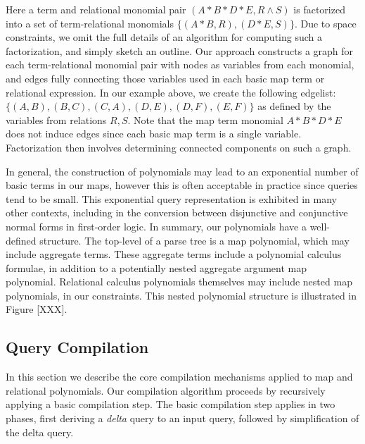Here a term and relational monomial pair $(A*B*D*E, R \wedge S)$ is factorized
into a set of term-relational monomials $\{(A*B,R), (D*E,S)\}$. Due to space
constraints, we omit the full details of an algorithm for computing such a
factorization, and simply sketch an outline. Our approach constructs a graph for
each term-relational monomial pair with nodes as variables from each monomial,
and edges fully connecting those variables used in each basic map term or
relational expression. In our example above, we create the following edgelist:
$\{(A,B), (B,C), (C,A), (D,E), (D,F), (E,F)\}$ as defined by the variables from
relations $R,S$. Note that the map term monomial $A*B*D*E$ does not induce edges
since each basic map term is a single variable. Factorization then involves
determining connected components on such a graph.

In general, the construction of polynomials may lead to an exponential number of
basic terms in our maps, however this is often acceptable in practice since
queries tend to be small. This exponential query representation is exhibited in
many other contexts, including in the conversion between disjunctive and
conjunctive normal forms in first-order logic. In summary, our polynomials have
a well-defined structure. The top-level of a parse tree is a map polynomial,
which may include aggregate terms. These aggregate terms include a polynomial
calculus formulae, in addition to a potentially nested aggregate argument map
polynomial. Relational calculus polynomials themselves may include nested map
polynomials, in our constraints.  This nested polynomial structure is
illustrated in Figure [XXX].


\subsection{Query Compilation}
In this section we describe the core compilation mechanisms applied to map and
relational polynomials. Our compilation algorithm proceeds by recursively
applying a basic compilation step. The basic compilation step applies in two
phases, first deriving a \textit{delta} query to an input query, followed by
simplification of the delta query. 


